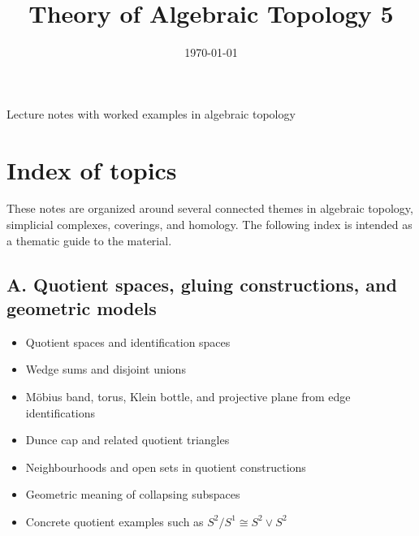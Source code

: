 \documentclass[12pt,a4paper]{article}
\title{\vspace{-1.5em}\bfseries Theory of Algebraic Topology 5}
\author{}
\date{\today}
\theoremstyle{notespace}
\begin{document}
	\maketitle
	\thispagestyle{plain}
		\begin{center}
		\begin{minipage}{0.92\textwidth}
			Lecture notes with worked examples in algebraic topology
		\end{minipage}
	\end{center}
		\tableofcontents
	\clearpage


	
	\tableofcontents
	\newpage
	
	\section*{Index of topics}
	
	These notes are organized around several connected themes in algebraic topology, simplicial complexes, coverings, and homology. The following index is intended as a thematic guide to the material.
	
	\subsection*{A. Quotient spaces, gluing constructions, and geometric models}
	\begin{itemize}
		\item Quotient spaces and identification spaces
		\item Wedge sums and disjoint unions
		\item Möbius band, torus, Klein bottle, and projective plane from edge identifications
		\item Dunce cap and related quotient triangles
		\item Neighbourhoods and open sets in quotient constructions
		\item Geometric meaning of collapsing subspaces
		\item Concrete quotient examples such as \(S^2/S^1\cong S^2\vee S^2\)
	\end{itemize}
	
\end{document}
